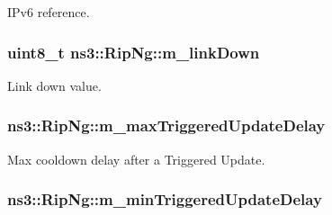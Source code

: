 I\+Pv6 reference. 

\subsubsection[{\texorpdfstring{m\+\_\+link\+Down}{m_linkDown}}]{\setlength{\rightskip}{0pt plus 5cm}uint8\+\_\+t ns3\+::\+Rip\+Ng\+::m\+\_\+link\+Down\hspace{0.3cm}{\ttfamily [private]}}\hypertarget{classns3_1_1RipNg_a6752c1bb1fc0909f0493033d426f2b92}{}\label{classns3_1_1RipNg_a6752c1bb1fc0909f0493033d426f2b92}


Link down value. 

\subsubsection[{\texorpdfstring{m\+\_\+max\+Triggered\+Update\+Delay}{m_maxTriggeredUpdateDelay}}]{ ns3\+::\+Rip\+Ng\+::m\+\_\+max\+Triggered\+Update\+Delay\hspace{0.3cm}{\ttfamily [private]}}\hypertarget{classns3_1_1RipNg_a7087e78333b3a5caabc13a83753a13a2}{}\label{classns3_1_1RipNg_a7087e78333b3a5caabc13a83753a13a2}


Max cooldown delay after a Triggered Update. 

\subsubsection[{\texorpdfstring{m\+\_\+min\+Triggered\+Update\+Delay}{m_minTriggeredUpdateDelay}}]{ ns3\+::\+Rip\+Ng\+::m\+\_\+min\+Triggered\+Update\+Delay\hspace{0.3cm}{\ttfamily [private]}}\hypertarget{classns3_1_1RipNg_a4da2b49a558678bd4c51a995fbfbf7af}{}\label{classns3_1_1RipNg_a4da2b49a558678bd4c51a995fbfbf7af}


